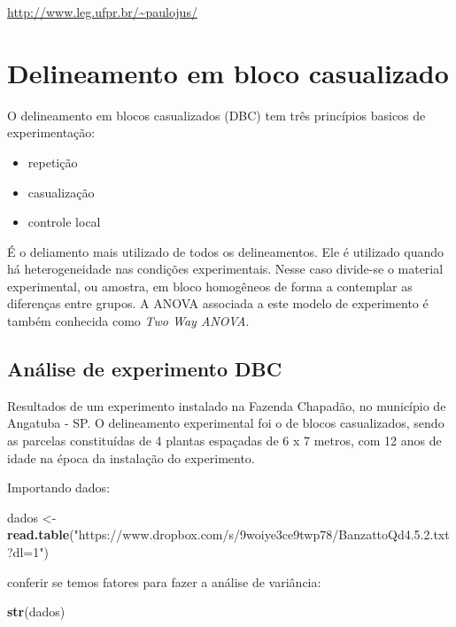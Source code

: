 \documentclass[
]{book}
\newenvironment{Shaded}{\begin{snugshade}}{\end{snugshade}}
\newcommand{\KeywordTok}[1]{\textcolor[rgb]{0.13,0.29,0.53}{\textbf{#1}}}
\newcommand{\NormalTok}[1]{#1}
\newcommand{\StringTok}[1]{\textcolor[rgb]{0.31,0.60,0.02}{#1}}
\begin{document}
\url{http://www.leg.ufpr.br/~paulojus/}

\hypertarget{delineamento-em-bloco-casualizado}{%
\section{Delineamento em bloco casualizado}\label{delineamento-em-bloco-casualizado}}

O delineamento em blocos casualizados (DBC) tem três princípios basicos de experimentação:

\begin{itemize}
\item
  repetição
\item
  casualização
\item
  controle local
\end{itemize}

É o deliamento mais utilizado de todos os delineamentos. Ele é utilizado quando há heterogeneidade nas condições experimentais. Nesse caso divide-se o material experimental, ou amostra, em bloco homogêneos de forma a contemplar as diferenças entre grupos. A ANOVA associada a este modelo de experimento é também conhecida como \emph{Two Way ANOVA}.

\hypertarget{anuxe1lise-de-experimento-dbc}{%
\subsection{Análise de experimento DBC}\label{anuxe1lise-de-experimento-dbc}}

Resultados de um experimento instalado na Fazenda Chapadão, no município de Angatuba - SP. O delineamento experimental foi o de blocos casualizados, sendo as parcelas constituídas de 4 plantas espaçadas de 6 x 7 metros, com 12 anos de idade na época da instalação do experimento.

Importando dados:

\begin{Shaded}
\begin{Highlighting}[]
\NormalTok{dados <-}\StringTok{ }\KeywordTok{read.table}\NormalTok{(}\StringTok{"https://www.dropbox.com/s/9woiye3ce9twp78/BanzattoQd4.5.2.txt?dl=1"}\NormalTok{) }
\end{Highlighting}
\end{Shaded}

conferir se temos fatores para fazer a análise de variância:

\begin{Shaded}
\begin{Highlighting}[]
\KeywordTok{str}\NormalTok{(dados)}
\end{Highlighting}
\end{Shaded}
\end{document}
